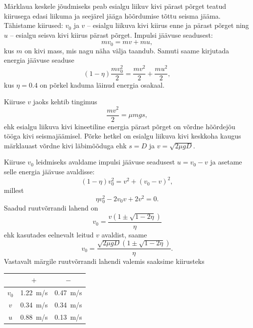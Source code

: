 \documentclass[10pt]{article}
\begin{document}
Märklaua keskele jõudmiseks peab esialgu liikuv kivi pärast põrget teatud kiirusega edasi liikuma ja seejärel jääga hõõrdumise tõttu seisma jääma. Tähistame kiirused: $v_0$ ja $v$ -- esialgu liikuva kivi kiirus enne ja pärast põrget ning $u$ -- esialgu seisva kivi kiirus pärast põrget. Impulsi jäävuse seadusest:
\begin{equation}
mv_0 = mv + mu,
\end{equation}
kus $m$ on kivi mass, mis nagu näha välja taandub. Samuti saame kirjutada energia jäävuse seaduse
\begin{equation}
\left(1-\eta\right)\frac{mv_0^2}{2} = \frac{mv^2}{2} + \frac{mu^2}{2},
\end{equation}
kus $\eta = \num{0.4}$ on põrkel kaduma läinud energia osakaal.

Kiiruse $v$ jaoks kehtib tingimus
\begin{equation}
\frac{mv^2}{2} = \mu mgs,
\end{equation}
ehk esialgu liikuva kivi kineetiline energia pärast põrget on võrdne hõõrdejõu tööga kivi seismajäämisel. Põrke hetkel on esialgu liikuva kivi keskkoha kaugus märklauast võrdne kivi läbimõõduga ehk $s = D$ ja $v = \sqrt{2\mu gD}$.

Kiiruse $v_0$ leidmiseks avaldame impulsi jäävuse seadusest $u = v_0 - v$ ja asetame selle energia jäävuse avaldisse:
\begin{equation}
\left( 1 - \eta \right)v_0^2 = v^2 + \left(v_0 - v\right)^2, 
\end{equation}
millest
\begin{equation}
\eta v_0^2 - 2v_0 v + 2v^2 = 0.
\end{equation}
Saadud ruutvõrrandi lahend on
\begin{equation}
v_0 =  \frac{v\left( 1 \pm \sqrt{1-2\eta} \right)}{\eta}
\end{equation}
ehk kasutades eelnevalt leitud $v$ avaldist, saame
\begin{equation}
v_0 =  \frac{\sqrt{2\mu gD}\left( 1 \pm \sqrt{1-2\eta} \right)}{\eta}.
\end{equation}
Vastavalt märgile ruutvõrrandi lahendi valemis saaksime kiirusteks

\begin{center}
\begin{tabular}{|c|c|c|}
\hline 
 & $+$ & $-$ \\ 
\hline 
$v_0$ & \SI{1.22}{m/s} & \SI{0.47}{m/s} \\ 
\hline 
$v$ & \SI{0.34}{m/s} & \SI{0.34}{m/s} \\ 
\hline 
$u$ & \SI{0.88}{m/s} & \SI{0.13}{m/s} \\ 
\hline 
\end{tabular}
\end{center}
\end{document}

